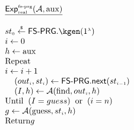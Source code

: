 

\

\begin{minipage}{57mm}
\begin{tcolorbox}[left=0mm]
$
  \begin{array}{l}
%
\underline{\mathsf{Exp}_{\sss \text{real}}^{\sss \text{fs-prg}}(\mathcal{A},\text{aux})}\\
%
\\
%
{st}_{\sss 0}\stackrel{\sss \$}\leftarrow \mathsf{FS\text{-}PRG}.\kgen(1^{\sss \lambda}) \\
%
i\gets 0\\ h\gets \text{aux} \\
\text {Repeat}\\
i\gets i+1\\
\hspace{4mm} ({out}_{\sss i}, st_{\sss i})\leftarrow    \mathsf{FS\text{-}PRG.next}    (st_{\sss i-1})\\
\hspace{4mm}  (I, h)\gets\mathcal{A}(\text{find}, out_{\sss i}, h)\\
\text{Until}\hspace{2mm}  (I=guess)\hspace{2mm}  \text{or} \hspace{2mm}  (i=n)\\
g\gets\mathcal{A}(\text{guess}, st_{\sss i}, h)\\
\text{Return} g\\
  \end{array}%
  \qquad$
  \end{tcolorbox}
   \end{minipage}
